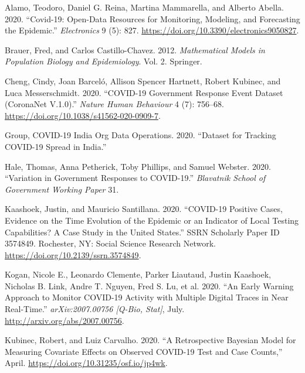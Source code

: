 \documentclass[
]{article}
\newlength{\cslhangindent}
\newenvironment{cslreferences}%
  {\setlength{\parindent}{0pt}%
  \everypar{\setlength{\hangindent}{\cslhangindent}}\ignorespaces}%
  {\par}
\begin{document}
\hypertarget{refs}{}
\begin{cslreferences}
\leavevmode\hypertarget{ref-alamoCovid19OpenDataResources2020}{}%
Alamo, Teodoro, Daniel G. Reina, Martina Mammarella, and Alberto Abella.
2020. ``Covid-19: Open-Data Resources for Monitoring, Modeling, and
Forecasting the Epidemic.'' \emph{Electronics} 9 (5): 827.
\url{https://doi.org/10.3390/electronics9050827}.

\leavevmode\hypertarget{ref-brauerMathematicalModelsPopulation2012}{}%
Brauer, Fred, and Carlos Castillo-Chavez. 2012. \emph{Mathematical
Models in Population Biology and Epidemiology}. Vol. 2. Springer.

\leavevmode\hypertarget{ref-chengCOVID19GovernmentResponse2020a}{}%
Cheng, Cindy, Joan Barceló, Allison Spencer Hartnett, Robert Kubinec,
and Luca Messerschmidt. 2020. ``COVID-19 Government Response Event
Dataset (CoronaNet V.1.0).'' \emph{Nature Human Behaviour} 4 (7):
756--68. \url{https://doi.org/10.1038/s41562-020-0909-7}.

\leavevmode\hypertarget{ref-covid19indiaorg2020tracker}{}%
Group, COVID-19 India Org Data Operations. 2020. ``Dataset for Tracking
COVID-19 Spread in India.''

\leavevmode\hypertarget{ref-haleVariationGovernmentResponses2020}{}%
Hale, Thomas, Anna Petherick, Toby Phillips, and Samuel Webster. 2020.
``Variation in Government Responses to COVID-19.'' \emph{Blavatnik
School of Government Working Paper} 31.

\leavevmode\hypertarget{ref-kaashoekCOVID19PositiveCases2020a}{}%
Kaashoek, Justin, and Mauricio Santillana. 2020. ``COVID-19 Positive
Cases, Evidence on the Time Evolution of the Epidemic or an Indicator of
Local Testing Capabilities? A Case Study in the United States.'' SSRN
Scholarly Paper ID 3574849. Rochester, NY: Social Science Research
Network. \url{https://doi.org/10.2139/ssrn.3574849}.

\leavevmode\hypertarget{ref-koganEarlyWarningApproach2020}{}%
Kogan, Nicole E., Leonardo Clemente, Parker Liautaud, Justin Kaashoek,
Nicholas B. Link, Andre T. Nguyen, Fred S. Lu, et al. 2020. ``An Early
Warning Approach to Monitor COVID-19 Activity with Multiple Digital
Traces in Near Real-Time.'' \emph{arXiv:2007.00756 {[}Q-Bio, Stat{]}},
July. \url{http://arxiv.org/abs/2007.00756}.

\leavevmode\hypertarget{ref-kubinecRetrospectiveBayesianModel2020}{}%
Kubinec, Robert, and Luiz Carvalho. 2020. ``A Retrospective Bayesian
Model for Measuring Covariate Effects on Observed COVID-19 Test and Case
Counts,'' April. \url{https://doi.org/10.31235/osf.io/jp4wk}.


\end{cslreferences}
\end{document}
